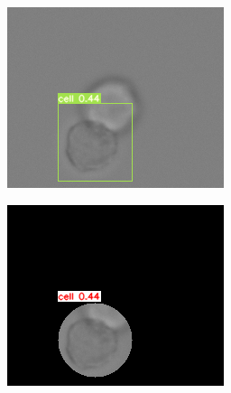 \begin{figure}[h]
\begin{center}
\begin{subfigure}[b]{0.25\textwidth}
		\end{subfigure}
		\begin{subfigure}[b]{0.25\textwidth}
		    \centering
			\includegraphics[width=\textwidth]{thesis-template-master/images/gbciou10.png}
			\caption{}
			\label{fig:cellnet}
		\end{subfigure}
		\begin{subfigure}[b]{0.25\textwidth}
		    \centering
			\includegraphics[width=\textwidth]{thesis-template-master/images/gbciou11.png}
			\caption{}
			\label{fig:cellnet}

\end{subfigure}
\end{center}
\end{figure}
